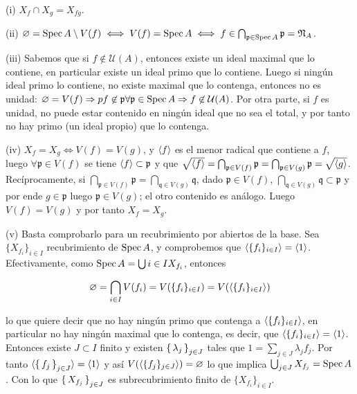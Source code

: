 \documentclass[../main.tex]{subfiles}
\begin{document}
(i) $X_f \cap X_g = X_{fg}$.

(ii) $\varnothing = \operatorname{Spec} A \setminus V(f) \iff V(f) = \operatorname{Spec} A \iff f \in \bigcap_{\mathfrak p \in \operatorname{Spec} A} \mathfrak p = \mathfrak N_A$.

(iii) Sabemos que si $f\not\in \mathcal U(A)$, entonces existe un ideal maximal que lo contiene, en particular existe un ideal primo que lo contiene. Luego si ningún ideal primo lo contiene, no existe maximal que lo contenga, entonces no es unidad:  $\varnothing = V(f) \Rightarrow pf \not \in \mathfrak p \forall \mathfrak p \in \operatorname{Spec} A \Rightarrow f \not\in \mathcal U(A)$. Por otra parte, si $f$ es unidad, no puede estar contenido en ningún ideal que no sea el total, y por tanto no hay primo (un ideal propio) que lo contenga.

(iv) $X_f = X_g \iff V(f) = V(g)$, y $\langle f \rangle$ es el menor radical que contiene a $f$, luego $\forall \mathfrak p \in V(f)$ se tiene $\langle f \rangle \subset \mathfrak p$ y que $\sqrt{\langle f \rangle} = \bigcap_{\mathfrak p \in V(f)} \mathfrak p = \bigcap_{\mathfrak p \in V(g)} \mathfrak{p} = \sqrt{\langle g \rangle}$.
Recíprocamente, si $\bigcap_{\mathfrak p \in V(f)} \mathfrak p = \bigcap_{\mathfrak q \in V(g)} \mathfrak{q}$, dado $\mathfrak p \in V(f)$, $ \bigcap_{\mathfrak{q} \in V(g)} \mathfrak{q} \subset \mathfrak{p}$ y por ende $g \in \mathfrak p$ luego $\mathfrak p \in V(g)$; el otro contenido es análogo. Luego $V(f) = V(g)$ y por tanto $X_f = X_g$.

(v) Basta comprobarlo para un recubrimiento por abiertos de la base. Sea $\{X_{f_i}\}_{i\in I}$ recubrimiento de $\operatorname{Spec} A$, y comprobemos que $\langle \{f_i\}_{i\in I} \rangle = \langle 1 \rangle$. Efectivamente, como $\operatorname{Spec} A = \bigcup{i\in I}X_{f_i} $, entonces

\begin{equation}
  \varnothing = \bigcap_{i\in I} V(f_i) = V(\{f_i\}_{i\in I}) = V(\langle \{f_i\}_{i\in I} \rangle)
\end{equation}

lo que quiere decir que no hay ningún primo que contenga a $\langle \{f_i\}_{i\in I} \rangle$, en particular no hay ningún maximal que lo contenga, es decir, que $\langle \{f_i\}_{i\in I} \rangle = \langle 1 \rangle$. Entonces existe $J\subset I$ finito y existen $\set{\lambda_j}_{j\in J}$ tales que $1 = \sum_{j\in J} \lambda_j f_j$.
Por tanto $\langle  \set{f_j}_{j\in J} \rangle = \langle  1 \rangle$ y así  $V(\langle \{f_j\}_{j\in J} \rangle )= \varnothing$ lo que implica $\bigcup_{j\in J} X_{f_j} = \operatorname{Spec} A$. Con lo que $\set{X_{f_j}}_{j\in J}$ es subrecubrimiento finito de $\{X_{f_i}\}_{i\in I}$.
\end{document}
